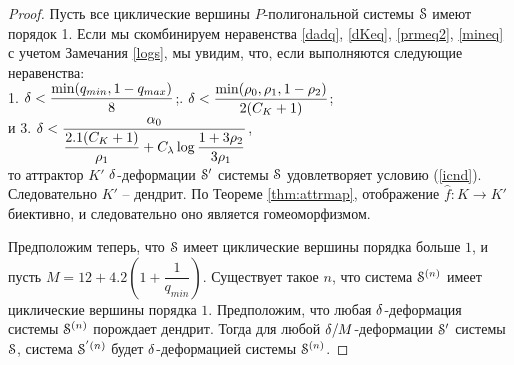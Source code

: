 \begin{proof}
Пусть все циклические вершины $P$-полигональной системы ${\EuScript S}$ имеют порядок 1. 
Если мы   скомбинируем неравенства \eqref{dadq}, \eqref{dKeq}, \eqref{prmeq2}, \eqref{mineq} с учетом Замечания \ref{logs}, мы увидим, что, если выполняются следующие неравенства:\\
1. $\delta<\dfrac{\mathop{\rm min} \nolimits(q_{min},1-q_{max})}{8}$;\qquad{}. $\delta<\dfrac{\mathop{\rm min} \nolimits(\rho_0,\rho_1,1-\rho_2)}{2(C_K+1)}$;\\
 и  
3. $\delta<\dfrac{\alpha_0}{\dfrac{2.1(C_K+1)}{\rho_1}+C_\lambda\log\dfrac{1+3\rho_2}{3\rho_1}}$,\\ 
то аттрактор $K'$ $\delta$-деформации ${\EuScript S}'$ системы ${\EuScript S}$ удовлетворяет условию (\ref{icnd}). 
Следовательно $K'$ -- дендрит. 
По Теореме \ref{thm:attrmap}, отображение $\hat f:K\to K'$ биективно, и следовательно оно является гомеоморфизмом.
 
Предположим теперь, что ${\EuScript S}$ имеет циклические вершины порядка больше $1$, и пусть $M=12+4.2\left(1+\dfrac{1}{q_{min}}\right)$. 
Существует такое $n$, что система ${\EuScript S}^{(n)}$ имеет циклические вершины порядка $1$. 
Предположим, что любая $\delta$-деформация системы ${\EuScript S}^{(n)}$ порождает дендрит. 
Тогда для любой $\delta/M$-деформации ${\EuScript S}'$ системы ${\EuScript S}$, система ${\EuScript S}^{'(n)}$ будет $\delta$-деформацией системы ${\EuScript S}^{(n)}$.
\end{proof}